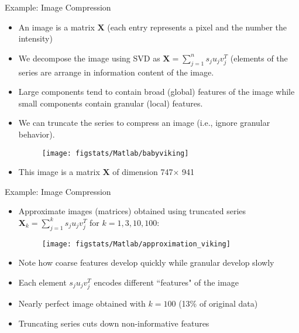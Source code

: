 \documentclass[9pt]{beamer}
\begin{document}
\begin{frame}{Example: Image Compression}

\begin{itemize}
\item An image is a matrix $\mathbf{X}$ (each entry represents a pixel and the number the intensity)
\item We decompose the image using SVD as $\mathbf{X}=\sum_{j=1}^ns_ju_jv_j^T$ (elements of the series are arrange in information content of the image. 
\item Large components tend to contain broad (global) features of the image while small components contain granular (local) features. 
\item We can truncate the series to compress an image (i.e., ignore granular behavior).


\begin{figure}[!htb]
    \centering
	\texttt{[image: figstats/Matlab/babyviking]}
\end{figure}

\item This image is a matrix $\mathbf{X}$ of dimension 747$\times$ 941
\end{itemize}

\end{frame}


\begin{frame}{Example: Image Compression}

\begin{itemize}
\item Approximate images (matrices) obtained using truncated series $\mathbf{X}_k=\sum_{j=1}^ks_ju_jv_j^T$ for $k=1,3,10,100$:


\begin{figure}[!htb]
    \centering
	\texttt{[image: figstats/Matlab/approximation\_viking]}
\end{figure}

\item Note how coarse features develop quickly while granular develop slowly
\item Each element $s_ju_jv_j^T$ encodes different ``features" of the image
\item Nearly perfect image obtained with $k=100$ (13\% of original data)
\item Truncating series cuts down non-informative features
\end{itemize}
\end{frame}
\end{document}
